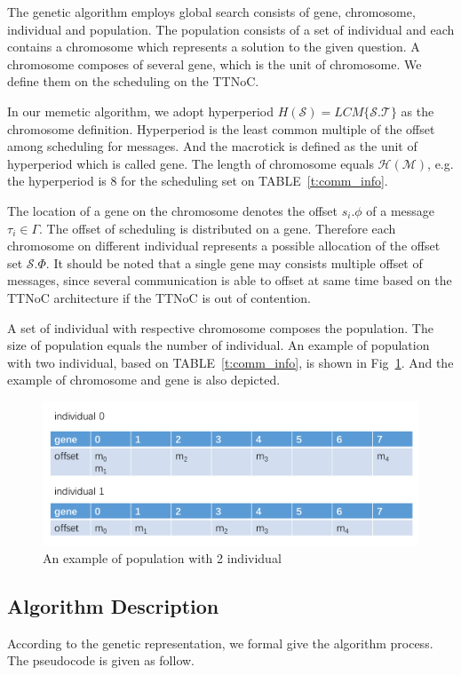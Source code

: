 \documentclass[journal]{IEEEtran}
\newcommand{\calS}{\mathcal{S}}
\newcommand{\calT}{\mathcal{T}}
\begin{document}
The genetic algorithm employs global search consists of gene, chromosome,
 individual and population. 
The population consists of a set of individual and each contains a chromosome which represents a solution to the given question. 
A chromosome composes of several gene,
 which is the unit of chromosome.
We define them on the scheduling on the TTNoC.

In our memetic algorithm,
 we adopt hyperperiod  $H(\calS) = LCM\{\calS.\calT\}$
 as the chromosome definition.
Hyperperiod is the least common multiple of the offset among scheduling for messages. 
And the macrotick is defined as the unit of hyperperiod which is called gene.
The length of chromosome equals $\mathcal{H(M)}$,
 e.g. the hyperperiod is 8 for the scheduling set on TABLE~\ref{t:comm_info}. 

The location of a gene on the chromosome denotes the offset $ s_i.\phi $ of a message $\tau_i\in\Gamma$.
The offset of scheduling is distributed on a gene.
Therefore each chromosome on different individual represents a possible allocation of the offset set $\calS.\Phi$.
It should be noted that a single gene may consists multiple offset of messages,
 since several communication is able to offset at same time based on the TTNoC architecture if the TTNoC is out of contention.

A set of individual with respective chromosome composes the population.
The size of population equals the number of individual.
An example of population with two individual,
 based on TABLE~\ref{t:comm_info},
  is shown in Fig~\ref{f:indi}.
And the example of chromosome and gene is also depicted.
\begin{figure}[!t]
	\centering
	\includegraphics[width=3 in]{picture/2individual}
	\caption{An example of population with 2 individual}
	\label{f:indi}
\end{figure}

\subsection{Algorithm Description}

According to the genetic representation, we formal give the algorithm process. The pseudocode is given as follow.
\end{document}
